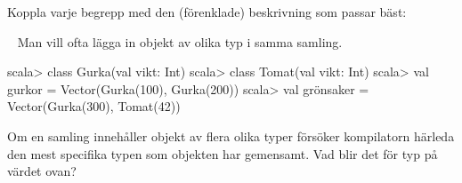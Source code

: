 

\ifPreSolution

\Exercise{\ExeWeekTEN}\label{exe:W10}

\begin{Goals}

\end{Goals}

\begin{Preparations}
\item {}
\end{Preparations}

\BasicTasks

\else

\ExerciseSolution{\ExeWeekTEN}

\BasicTasks

\fi




\QUESTBEGIN

\Task \what

\vspace{1em}\noindent Koppla varje begrepp med den (förenklade) beskrivning som passar bäst:

\begin{ConceptConnections}

\end{ConceptConnections}

\SOLUTION

\TaskSolved \what

\begin{ConceptConnections}

\end{ConceptConnections}

\QUESTEND






\QUESTBEGIN

\Task  \what~  Man vill ofta lägga in objekt av olika typ i samma samling.
\begin{REPL}
scala> class Gurka(val vikt: Int)
scala> class Tomat(val vikt: Int)
scala> val gurkor = Vector(Gurka(100), Gurka(200))
scala> val grönsaker = Vector(Gurka(300), Tomat(42))
\end{REPL}

\Subtask Om en samling innehåller objekt av flera olika typer försöker kompilatorn härleda den mest specifika typen som objekten har gemensamt. Vad blir det för typ på värdet  ovan?

